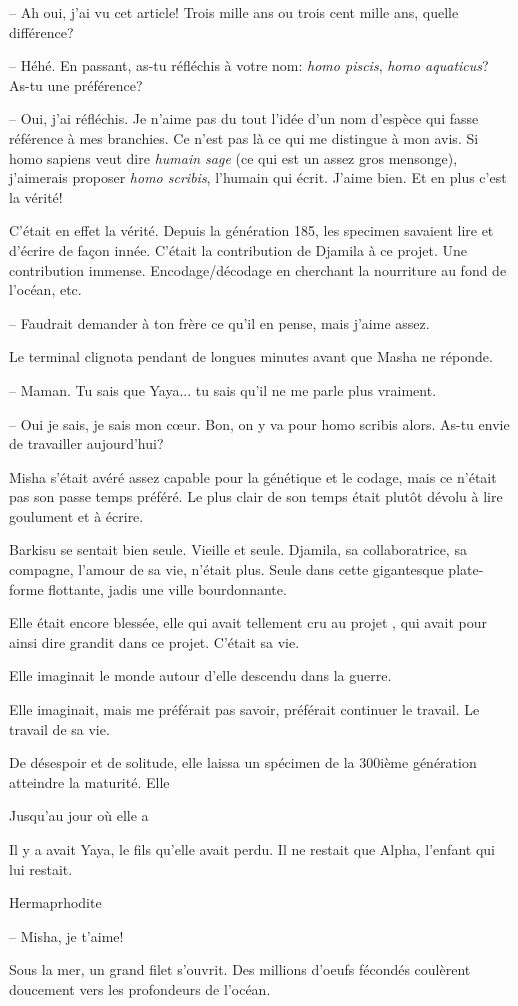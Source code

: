 -- Ah oui, j'ai vu cet article! Trois mille ans ou trois cent mille ans, quelle différence?

-- Héhé. En passant, as-tu réfléchis à votre nom: \textit{homo piscis}, \textit{homo aquaticus}? As-tu une préférence?

-- Oui, j'ai réfléchis. Je n'aime pas du tout l'idée d'un nom d'espèce qui fasse référence à mes branchies. Ce n'est pas là ce qui me distingue à mon avis. 
   Si homo sapiens veut dire \textit{humain sage} (ce qui est un assez gros mensonge), j'aimerais
   proposer \textit{homo scribis}, l'humain qui écrit. J'aime bien. Et en plus c'est la vérité!

C'était en effet la vérité. Depuis la génération 185, les specimen savaient lire et d'écrire de façon innée. C'était
la contribution de Djamila à ce projet. Une contribution immense. Encodage/décodage en cherchant la nourriture au fond de l'océan, etc.

-- Faudrait demander à ton frère ce qu'il en pense, mais j'aime assez.

Le terminal clignota pendant de longues minutes avant que Masha ne réponde. 

-- Maman. Tu sais que Yaya... tu sais qu'il ne me parle plus vraiment.

-- Oui je sais, je sais mon c\oe ur. Bon, on y va pour homo scribis alors. As-tu envie de travailler aujourd'hui?

Misha s'était avéré assez capable pour la génétique et le codage, mais ce n'était pas son passe temps préféré.
Le plus clair de son temps était plutôt dévolu à lire goulument et à écrire.

Barkisu se sentait bien seule. Vieille et seule.
Djamila, sa collaboratrice, sa compagne, l'amour de sa vie, n'était plus.
Seule dans cette gigantesque plate-forme flottante, jadis une ville bourdonnante.

Elle était encore blessée, elle qui avait tellement cru au projet \nomProjet{},
qui avait pour ainsi dire grandit dans ce projet. C'était sa vie.

Elle imaginait le monde autour d'elle descendu dans la guerre.

Elle imaginait, mais me préférait pas savoir, préférait continuer le travail.
Le travail de sa vie. 

De désespoir et de solitude, elle laissa un spécimen de la 300ième génération atteindre la maturité.
Elle 

Jusqu'au jour où elle a 

Il y a avait Yaya, le fils qu'elle avait perdu.
Il ne restait que Alpha, l'enfant qui lui restait.

\sautSection{}

Hermaprhodite

\sautSection{}

-- Misha, je t'aime!

Sous la mer, un grand filet s'ouvrit. Des millions d'oeufs fécondés coulèrent
doucement vers les profondeurs de l'océan.


